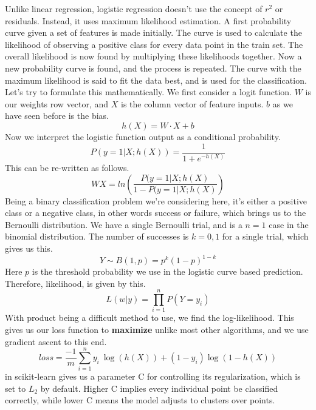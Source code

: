 \documentclass{article}
\newcommand{\code}[1]{{\fontfamily{zi4} \selectfont{#1}}}
\begin{document}
Unlike linear regression, logistic regression doesn't use the concept of $r^2$ or residuals. Instead, it uses maximum likelihood estimation. A first probability curve given a set of features is made initially. The curve is used to calculate the likelihood of observing a positive class for every data point in the train set. The overall likelihood is now found by multiplying these likelihoods together. Now a new probability curve is found, and the process is repeated. The curve with the maximum likelihood is said to fit the data best, and is used for the classification. Let's try to formulate this mathematically. We first consider a logit function. $W$ is our weights row vector, and $X$ is the column vector of feature inputs. $b$ as we have seen before is the bias.
$$h(X) = W \cdot X + b$$
Now we interpret the logistic function output as a conditional probability. 
$$P(y=1|X; h(X)) = \frac{1}{1+e^{-h(X)}}$$
This can be re-written as follows.
$$WX = ln \left( \frac{P(y=1|X; h(X)}{1-P(y=1|X; h(X)} \right) $$
Being a binary classification problem we're considering here, it's either a positive class or a negative class, in other words success or failure, which brings us to the Bernoulli distribution. We have a single Bernoulli trial, and is a $n=1$ case in the binomial distribution. The number of successes is $k = {0, 1}$ for a single trial, which gives us this.
$$Y \sim B(1, p) = p^k (1-p)^{1-k}$$
Here $p$ is the threshold probability we use in the logistic curve based prediction. Therefore, likelihood, is given by this.
$$L(w|y) = \prod_{i=1}^n P(Y=y_i)$$
With product being a difficult method to use, we find the log-likelihood. This gives us our loss function to \textbf{maximize} unlike most other algorithms, and we use gradient ascent to this end.
$$loss = \frac{-1}{m} \sum_{i=1}^n y_i \
\log(h(X)) + (1-y_i) \log(1-h(X))$$
\code{LogisticRegression} in scikit-learn gives us a parameter C for controlling its regularization, which is set to $L_2$ by default. Higher C implies every individual point be classified correctly, while lower C means the model adjusts to clusters over points.
\end{document}
